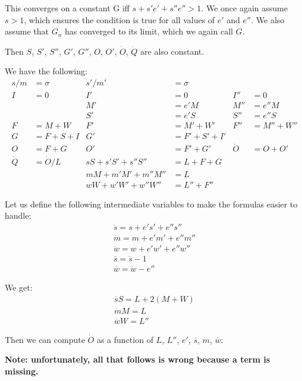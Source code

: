 \documentclass{article}
\begin{document}
This converges on a constant G iff $s+s'e'+s''e'' > 1$. We once again
assume $s > 1$, which ensures the condition is true for all values of
$e'$ and $e''$. We also assume that $G_n$ has converged to its limit,
which we again call $G$.

Then $S$, $S'$, $S''$, $G'$, $G''$, $O$, $O'$,
$\dot{O}$, $\dot{Q}$ are also constant.

We have the following:
\begin{align*}
s/m &= \sigma  &  s'/m' &= \sigma \\
I &= 0  &  I' &= 0  &  I'' &= 0  \\
 & & M' &= e'M  &  M'' &= e''M \\
 & & S' &= e'S  &  S'' &= e''S \\
F &= M + W  &  F' &= M' + W'  &  F'' &= M'' + W'' \\
G &= F + S + I  &  G' &= F' + S' + I' \\
O &= F + G  &  O' &= F' + G' & \dot{O} &= O + O' \\
\dot{Q} &= \dot{O}/L  & sS + s'S' + s''S'' &= L + F + G \\
             &         &  mM + m'M' + m''M'' &= L \\
             &         &  wW + w'W' + w''W'' &= L'' + F''
\end{align*}

Let us define the following intermediate variables to make the
formulas easier to handle:
\begin{gather}
\ddot{s} = s + e's' + e''s'' \\
\ddot{m} = m + e'm' + e''m'' \\
\ddot{w} = w + e'w' + e''w'' \\
\overline{s} = \ddot{s} - 1 \\
\overline{w} = \ddot{w} - e''
\end{gather}

We get:
\begin{gather}
\overline{s} S = L + 2(M + W) \\
\ddot{m}M = L \\
\overline{w}W = L''
\end{gather}

Then we can compute $\dot{O}$ as a function of $L$, $L''$, $e'$,
$\overline{s}$, $\ddot{m}$, $\overline{w}$:

\bigskip
\bigskip
\bigskip

{\bf Note: unfortunately, all that follows is wrong because a term is missing.}

\bigskip
\bigskip
\bigskip
\end{document}
